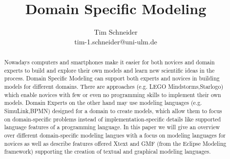 \documentclass[runningheads,a4paper]{llncs}
\begin{document}
\mainmatter  %

\title{Domain Specific Modeling}



\author{Tim Schneider\\ tim-1.schneider@uni-ulm.de}


\maketitle


\begin{abstract}
Nowadays computers and smartphones make it easier for both novices and domain experts to build 
and explore their own models and learn new scientific ideas in the process.
Domain Specific Modeling can support both experts and novices in building models for different domains.
There are approaches (e.g. LEGO Mindstorms,Starlogo) which enable novices with few or even no programming 
skills to implement their own models.
Domain Experts on the other hand may use modeling languages (e.g. SimuLink,BPMN) designed for a domain to create models, 
which allow them to focus on domain-specific problems instead of implementation-specific details like supported 
language features of a programming language.
In this paper we will give an overview over different domain-specific modeling langues with a focus on modeling languages for novices
as well as describe features offered Xtext and GMF (from the Eclipse Modeling framework) supporting the creation of textual and graphical modeling languages.
\end{abstract}
\end{document}
